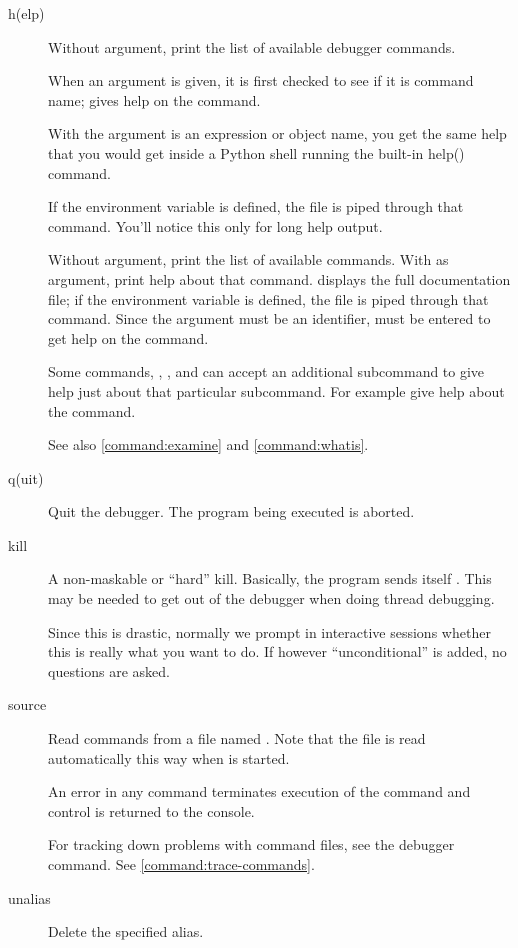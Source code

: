 \begin{description}
\item[h(elp) ]

Without argument, print the list of available debugger commands.

When an argument is given, it is first checked to see if it is command
name;  gives help on the \samp{!} command.

With the argument is an expression or object name, you get the same
help that you would get inside a Python shell running the built-in
help() command.

If the environment variable  is defined, the file is
piped through that command.  You'll notice this only for long help
output.

Without argument, print the list of available commands.  With
 as argument, print help about that command.   displays the full documentation file; if the environment
variable  is defined, the file is piped through that
command.  Since the  argument must be an identifier,
 must be entered to get help on the \samp{!} command.

Some commands, , , and  can accept an
additional subcommand to give help just about that particular
subcommand. For example  give help about the
 command.

See also \ref{command:examine} and \ref{command:whatis}.

\item[q(uit)]\label{command:quit}

Quit the debugger. The program being executed is aborted.

\item[kill ]\label{command:kill}

A non-maskable or ``hard'' kill. Basically, the program sends itself
. This may be needed to get out of the debugger when
doing thread debugging.

Since this is drastic, normally we prompt in interactive sessions
whether this is really what you want to do. If however
``unconditional'' is added, no questions are asked.

\item[source ]\label{command:source}

Read commands from a file named .
Note that the file  is read automatically
this way when  is started.

An error in any command terminates execution of the command and
control is returned to the console.

For tracking down problems with command files, see the  debugger command. See \ref{command:trace-commands}. 

\item[unalias ]\label{command:unalias}

Delete the specified alias.

\end{description}

